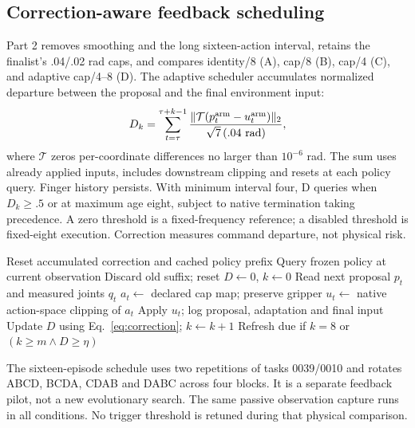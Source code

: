 \documentclass[sigconf,dvipsnames]{acmart}
\begin{document}
\subsection{Correction-aware feedback scheduling}
Part 2 removes smoothing and the long sixteen-action interval, retains the finalist's
.04/.02 rad caps, and compares identity/8 (A), cap/8 (B), cap/4 (C), and adaptive
cap/4--8 (D). The adaptive scheduler accumulates normalized departure between
the proposal and the final environment input:
\begin{equation}
 D_k=\sum_{t=\tau}^{\tau+k-1}
 \frac{\|\mathcal T(p_t^{\rm arm}-u_t^{\rm arm})\|_2}{\sqrt7\,(.04\ \mathrm{rad})},
 \label{eq:correction}
\end{equation}
where $\mathcal T$ zeros per-coordinate differences no larger than $10^{-6}$ rad.
The sum uses already applied inputs, includes downstream clipping and resets at
each policy query. Finger history persists. With minimum interval four, D queries
when $D_k\ge.5$ or at maximum age eight, subject to native termination taking
precedence. A zero threshold is a fixed-frequency reference; a disabled threshold
is fixed-eight execution. Correction measures command departure, not physical risk.

\begin{algorithm}[t]
\caption{Causal correction-aware execution interface}
\label{alg:feedback}
\begin{algorithmic}[1]
\State Reset accumulated correction and cached policy prefix
    \State Query frozen policy at current observation
    \State Discard old suffix; reset $D\gets0$, $k\gets0$
  \EndIf
  \State Read next proposal $p_t$ and measured joints $q_t$
  \State $a_t\gets$ declared cap map; preserve gripper
  \State $u_t\gets$ native action-space clipping of $a_t$
  \State Apply $u_t$; log proposal, adaptation and final input
  \State Update $D$ using Eq.~\eqref{eq:correction}; $k\gets k+1$
  \State Refresh due if $k=8$ or $(k\ge m\land D\ge\eta)$
\EndWhile
\end{algorithmic}
\end{algorithm}

The sixteen-episode schedule uses two repetitions of tasks 0039/0010 and rotates
ABCD, BCDA, CDAB and DABC across four blocks. It is a separate feedback pilot,
not a new evolutionary search. The same passive observation capture runs in all
conditions. No trigger threshold is retuned during that physical comparison.
\end{document}
